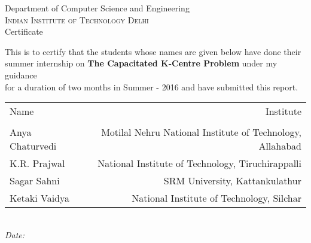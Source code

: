 \documentclass[12pt,a4paper,onecolumn]{article}
\begin{document}
\begin{titlepage}
\vfill %



\newpage
\thispagestyle{empty}

\begin{center}

\large{Department of Computer Science and Engineering}\\[0.5cm]
\normalsize
\textsc{Indian Institute of Technology Delhi}\\[2.0cm]

\LARGE Certificate\\[1 cm]

\end{center}
\normalsize \begin{flushleft}
This is to certify that the students whose names are given below have done their summer internship on \textbf{The Capacitated K-Centre Problem} under my guidance \\for a duration of two months  in Summer - 2016  and have submitted this report.
\end{flushleft}
\vspace{0.5cm}
\begin{table}[h]
\centering
\begin{tabular}{lr}
 Name & Institute \\
\\
Anya Chaturvedi & Motilal Nehru National Institute of Technology, Allahabad \\ 
K.R. Prajwal &  National Institute of Technology, Tiruchirappalli \\
Sagar Sahni & SRM University, Kattankulathur \\
Ketaki Vaidya & National Institute of Technology, Silchar
\end{tabular}
\end{table}

\vspace{4cm}



 \begin{minipage}{0.4\textwidth}
\begin{flushleft} \large
\emph{\\Date:}\\


\end{flushleft}
\end{minipage}
\end{titlepage}
\end{document}
